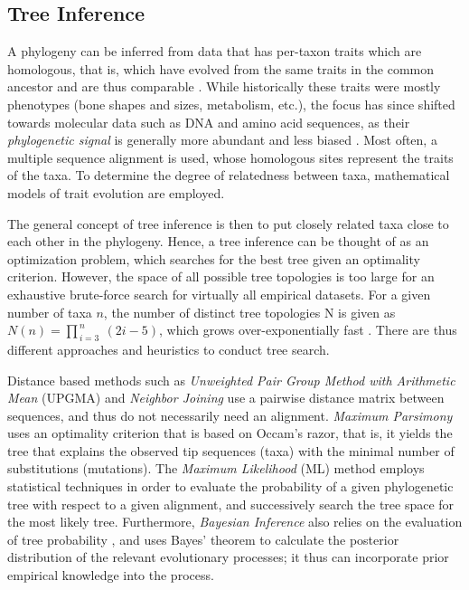 

\subsection{Tree Inference}
\label{ch:Foundations:sec:TreeOfLife:sub:TreeInference}

A phylogeny can be inferred from data that has per-taxon traits which are homologous,
that is, which have evolved from the same traits in the common ancestor and are thus comparable \cite{Felsenstein2004,Yang2006}.
While historically these traits were mostly phenotypes (bone shapes and sizes, metabolism, etc.),
the focus has since shifted towards molecular data such as DNA and amino acid sequences,
as their \emph{phylogenetic signal} is generally more abundant and less biased \cite{Hillis2000}.
Most often, a multiple sequence alignment is used,
whose homologous sites represent the traits of the taxa.
To determine the degree of relatedness between taxa, mathematical models of trait evolution are employed.

The general concept of tree inference is then to put closely related taxa close to each other in the phylogeny.
Hence, a tree inference can be thought of as an optimization problem,
which searches for the best tree given an optimality criterion.
However, the space of all possible tree topologies is too large for an exhaustive brute-force search
for virtually all empirical datasets.
For a given number of taxa $n$, the number of distinct tree topologies N is given as
$N(n) = \prod_{\,i=3}^{\,n} ~(2i - 5)$,
which grows over-exponentially fast \cite{Felsenstein2004}.
There are thus different approaches and heuristics to conduct tree search.

Distance based methods such as \emph{Unweighted Pair Group Method with Arithmetic Mean} (UPGMA) \cite{Sokal1958}
and \emph{Neighbor Joining} \cite{Saitou1987}
use a pairwise distance matrix between sequences, and thus do not necessarily need an alignment.
\emph{Maximum Parsimony} \cite{Sankoff1975} uses an optimality criterion that is based on Occam's razor,
that is, it yields the tree that explains the observed tip sequences (taxa)
with the minimal number of substitutions (mutations).
The \emph{Maximum Likelihood} (ML) method \cite{Felsenstein1981} employs statistical techniques
in order to evaluate the probability of a given phylogenetic tree with respect to a given alignment,
and successively search the tree space for the most likely tree.
Furthermore, \emph{Bayesian Inference} also relies on the evaluation of tree probability \cite{Yang2006},
and uses Bayes' theorem to calculate the posterior distribution of the relevant evolutionary processes;
it thus can incorporate prior empirical knowledge into the process.

